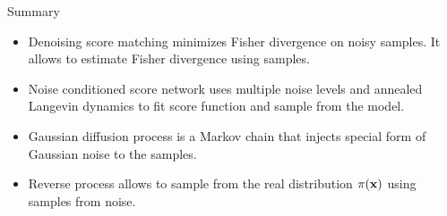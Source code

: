 \begin{frame}{Summary}
	\begin{itemize}
		\item Denoising score matching minimizes Fisher divergence on noisy samples. It allows to estimate Fisher divergence using samples.
		\vfill
		\item Noise conditioned score network uses multiple noise levels and annealed Langevin dynamics to fit score function and sample from the model.	
		\vfill
		\item Gaussian diffusion process is a Markov chain that injects special form of Gaussian noise to the samples.
		\vfill
		\item Reverse process allows to sample from the real distribution $\pi(\mathbf{x})$ using samples from noise.
	\end{itemize}
\end{frame}
 